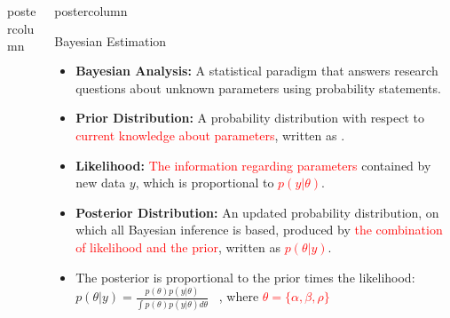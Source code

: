 \documentclass[final]{beamer}\usepackage[]{graphicx}\usepackage[]{color}
\newcommand{\red}{\textcolor{red}}
\newlength{\columnheight}\setlength{\columnheight}{75cm} %
\begin{document}
{\begin{frame}
\begin{columns}
\begin{column}{.33\textwidth}
\begin{beamercolorbox}[center,wd=\textwidth]{postercolumn}
\begin{minipage}[T]{.97\textwidth}
{}
\end{minipage}
\end{beamercolorbox}
\end{column}
\begin{column}{.33\textwidth}
\begin{beamercolorbox}[center,wd=\textwidth]{postercolumn}
\begin{minipage}[T]{.97\textwidth} %
\parbox[t][\columnheight]{\textwidth}{ %



\begin{block}{Bayesian Estimation}

 	\begin{itemize}
		\item \textbf{Bayesian Analysis:} A statistical paradigm that answers research questions about unknown parameters using probability statements.
		\vspace{0.4cm}
		\item \textbf{Prior Distribution:} A probability distribution with respect to \red{current knowledge about parameters}, written as \boldmath{\red{$p(\theta)$}}.
		\vspace{0.4cm}
		\item \textbf{Likelihood:} \red{The information regarding parameters} contained by new data $y$, which is proportional to \red{$p(y|\theta)$}. 
		\vspace{0.4cm}
		\item \textbf{Posterior Distribution:} An updated probability distribution, on which all Bayesian inference is based, produced by \red{the combination of likelihood and the prior}, written as \red{$p(\theta|y)$}.
		\vspace{0.4cm}
		\item The posterior is proportional to the prior times the likelihood:\\ 
		\vspace{0.6cm}
		$\displaystyle{p(\theta|y)=\frac{p(\theta)p(y|\theta)}{\int p(\theta)p(y|\theta)d\theta}}$
		\ , where \red{$\theta = \{\alpha, \beta, \rho\}$}
	\end{itemize}



\end{block}}
\end{minipage}
\end{beamercolorbox}
\end{column}
\end{columns}
\end{frame}}
\end{document}
